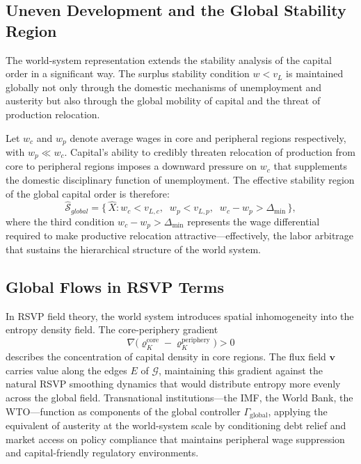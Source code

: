 \documentclass[12pt,a4paper]{article}
\theoremstyle{definition}
\theoremstyle{remark}
\begin{document}
\subsection{Uneven Development and the Global Stability Region}

The world-system representation extends the stability analysis of the capital order in a significant way. The surplus stability condition $w < v_L$ is maintained globally not only through the domestic mechanisms of unemployment and austerity but also through the global mobility of capital and the threat of production relocation.

Let $w_c$ and $w_p$ denote average wages in core and peripheral regions respectively, with $w_p \ll w_c$. Capital's ability to credibly threaten relocation of production from core to peripheral regions imposes a downward pressure on $w_c$ that supplements the domestic disciplinary function of unemployment. The effective stability region of the global capital order is therefore:
\begin{equation}
  \hat{\mathcal{S}}_{global} = \bigl\{\, \hat{X} : w_c < v_{L,c},\;\; w_p < v_{L,p},\;\;
  w_c - w_p > \Delta_{\min} \,\bigr\},
\end{equation}
where the third condition $w_c - w_p > \Delta_{\min}$ represents the wage differential required to make productive relocation attractive---effectively, the labor arbitrage that sustains the hierarchical structure of the world system.

\subsection{Global Flows in RSVP Terms}

In RSVP field theory, the world system introduces spatial inhomogeneity into the entropy density field. The core-periphery gradient
\begin{equation}
  \nabla\!\bigl(\varrho_K^{\text{core}} - \varrho_K^{\text{periphery}}\bigr) > 0
\end{equation}
describes the concentration of capital density in core regions. The flux field $\mathbf{v}$ carries value along the edges $E$ of $\mathcal{G}$, maintaining this gradient against the natural RSVP smoothing dynamics that would distribute entropy more evenly across the global field. Transnational institutions---the IMF, the World Bank, the WTO---function as components of the global controller $\Gamma_{\text{global}}$, applying the equivalent of austerity at the world-system scale by conditioning debt relief and market access on policy compliance that maintains peripheral wage suppression and capital-friendly regulatory environments.
\end{document}

